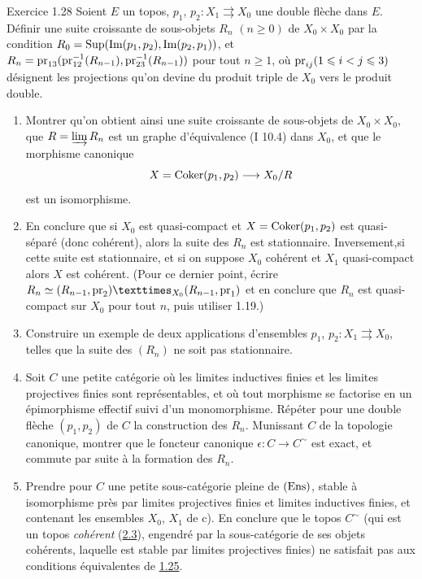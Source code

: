 \documentclass[10pt]{../fichiers-configuration-latex/smfart}
\begin{document}
\begin{enonce*}[remark]{Exercice 1.28}
Soient $E$ un topos, $p_1$, $p_2 : X_1 \rightrightarrows X_0$ une double
flèche dans $E$. Définir une suite croissante de sous-objets $R_n$ $(n
\geq 0)$ de $X_0\times X_0$ par la condition $R_0 = \operatorname{Sup}(\text{Im}(p_1,
p_2), \text{Im}(p_2, p_1))$, et $R_n = \operatorname{pr}_{13} (\operatorname{pr}_{12}^{-1} (R_{n-1}),
\operatorname{pr}_{23}^{-1}(R_{n-1}))$ pour tout $n \geq 1$, où $\operatorname{pr}_{ij} (1 \leqslant i
< j \leqslant 3)$ désignent les projections qu'on devine du produit triple
de $X_0$ vers le produit double.
\begin{enumerate}
\renewcommand{\theenumi}{\alph{enumi}}
\renewcommand{\labelenumi}{\theenumi)}
\item Montrer qu'on obtient ainsi une suite croissante de sous-objets
  de $X_0\times X_0$, que $R = \varinjlim R_n$ est un graphe
  d'équivalence (I 10.4) dans $X_0$, et que le morphisme canonique
$$
X = \Coker (p_1, p_2) \to X_0 /R
$$
est un isomorphisme.

\item En conclure que si $X_0$ est quasi-compact et $X = \operatorname{Coker}(p_1,
  p_2)$ est quasi-séparé (donc cohérent), alors la suite des $R_n$ est
  stationnaire. Inversement,\pageoriginale si cette suite est
  stationnaire, et si on suppose $X_0$
cohérent et $X_1$ quasi-compact alors $X$ est cohérent. (Pour ce
dernier point, écrire $R_n \simeq \fprod{(R_{n-1}, \pr_2)}{(R_{n-1},
  \pr_1)}{X_0}$ et en conclure que $R_n$ est quasi-compact sur $X_0$
pour tout $n$, puis utiliser 1.19.)

\item Construire un exemple de deux applications d'ensembles $p_1$, $p_2
  : X_1 \rightrightarrows X_0$, telles que la suite des $(R_n)$ ne
  soit pas stationnaire.

\item Soit $C$ une petite catégorie où les limites inductives finies
  et les limites projectives finies sont représentables, et où tout
  morphisme se factorise en un épimorphisme effectif suivi d'un
  monomorphisme. Répéter pour une double flèche $(p_1, p_2)$ de $C$ la
  construction des $R_n$. Munissant $C$ de la topologie canonique,
  montrer que le foncteur canonique $\epsilon : C \to C^{\sim}$ est exact, et
  commute par suite à la formation des $R_n$.

\item Prendre pour $C$ une petite sous-catégorie pleine de $(\operatorname{Ens})$,
  stable à isomorphisme près par limites projectives finies et limites
  inductives finies, et contenant les ensembles $X_0$, $X_1$ de c). En
  conclure que le topos $C^{\sim}$ (qui est un topos
  \emph{cohérent} (\hyperref[VI.def2.3]{2.3}), \ie engendré par la sous-catégorie de ses
  objets cohérents, laquelle est stable par limites projectives finies)
  ne satisfait pas aux conditions équivalentes de \hyperref[VI.cor1.25]{1.25}.


\end{enumerate}
\end{enonce*}
\end{document}
